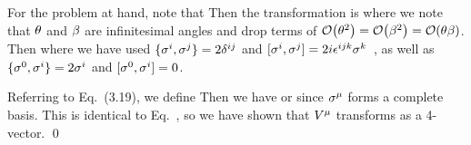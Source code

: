 {	For the problem at hand, note that
	Then the transformation is
	where we note that $\theta$ and $\beta$ are infinitesimal angles and drop terms of $\order{\tht^2} = \order{\bet^2} = \order{\tht \bet}$.  Then
	where we have used $\{ \sigma^i, \sigma^j \} = 2 \delta^{i j}$ and $[\sigma^i, \sigma^j] = 2i \epsilon^{i j k} \sigma^k$~\cite[p.~165]{Sakurai}, as well as $\{ \sigma^0, \sigma^i \} = 2 \sigma^i$ and ${[\sigma^0, \sigma^i] = 0}$.
	
	Referring to Eq.~(3.19), we define
	Then we have
	\al{
		\Vsm \sigm &\to \Vsm \sigm + \Vso \omgoi \sigsi - \Vsi \omgoi - \Vsj \omgij \sigj
		= \Vsm \sigm + \Vo \omgsoi \sigi - \Vi \omgsoi \sigo + \Vj \omgsij \sigj \\
		&= \Vsm \sigm + \Vo \omgsom \sigm + \Vi \omgsio \sigo + \Vj \omgsij \sigj
		= \Vsm \sigm + \Vn \omgsnm \sigm
		= (\delnsm + \omgnsm) \Vsn \sigm
	}
	or
	\eq{
		\Va \sigsa \to (\delasb + \omgasb) \Vb \sigsa
		\qimplies
		\ans{ \Va \to (\delasb + \omgasb) \Vb, }
	}
	since $\sigma^\mu$ forms a complete basis.  This is identical to Eq.~, so we have shown that $V^\mu$ transforms as a 4-vector. \qed
}